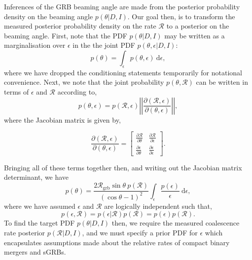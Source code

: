 \documentclass[twocolumn,nofootinbib]{revtex4-1}
\newcommand{\grbrate}{{{\mathcal R}_{\mathrm{grb}}}}
\newcommand{\cbcrate}{{{\mathcal R}}}
\newcommand{\diff}{{\mathrm d}}
\begin{document}
Inferences of the GRB beaming angle are made from the posterior probability
density on the beaming angle $p(\theta|D,I)$.  Our goal then, is to transform
the measured posterior probability density on the rate $\cbcrate$ to a posterior
on the beaming angle.
%
First, note that the PDF $p(\theta|D,I)$ may be written as a marginalisation
over $\epsilon$ in the the joint PDF $p(\theta, \epsilon|D,I)$:
%
\begin{equation}
p(\theta) = \int_{\epsilon} p(\theta,\epsilon)~\diff \epsilon,
\end{equation}
%
where we have dropped the conditioning statements temporarily for notational
convenience.  Next, we note that the joint probability $p(\theta,\cbcrate)$ can
be written in terms of $\epsilon$ and $\cbcrate$ according to,
%
\begin{equation}
p(\theta,\epsilon) = p(\cbcrate,\epsilon)
\left\lvert\left\lvert
\frac{\partial(\cbcrate,\epsilon)}{\partial(\theta,\epsilon)}
\right\rvert\right\rvert,
\end{equation}
%
where the Jacobian matrix is given by,
\begingroup
\renewcommand*{\arraystretch}{1.5}

\begin{equation}
\frac{\partial (\cbcrate,\epsilon)}{\partial(\theta,\epsilon)} =
\begin{bmatrix}
\frac{\partial \cbcrate}{\partial \theta} & \frac{\partial \cbcrate}{\partial \epsilon} \\
\frac{\partial \epsilon}{\partial \theta} & \frac{\partial \epsilon}{\partial \epsilon}
\end{bmatrix}.
\end{equation}

\endgroup
Bringing all of these terms together then, and writing out the Jacobian matrix
determinant, we have
%
\begin{equation}\label{eq:marginaltheta}
p(\theta) = \frac{2\grbrate \sin
\theta~p(\cbcrate)}{(\cos\theta-1)^2}\int_{\epsilon} \frac{p(\epsilon)}{\epsilon} ~\diff
\epsilon,
\end{equation}
%
where we have assumed $\epsilon$ and $\cbcrate$ are logically independent such
that,
\begin{equation}
p(\epsilon,\cbcrate) = p(\epsilon|\cbcrate)p(\cbcrate) = p(\epsilon)p(\cbcrate).
\end{equation}
%
%
To find the target PDF $p(\theta|D,I)$ then, we require the measured coalescence
rate posterior $p(\cbcrate|D,I)$, and we must specify a prior PDF for $\epsilon$
which encapsulates assumptions made about the relative rates of compact binary
mergers and sGRBs.
 
\end{document}
